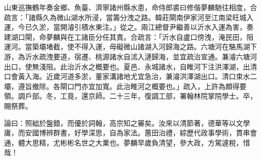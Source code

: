 \begin{pinyinscope}
山東巡撫鶴年奏金鄉、魚臺、濟寧諸州縣水患，命侍郎裘曰修偕夢麟馳往相度，合疏言：「諸縣久為微山湖水所浸，當籌分洩之路。韓莊閘南伊家河至江南梁旺城入運，今已久淤，當開濬引積水東注。」從之。兩江總督尹繼善以沂水入運為害，奏建湖口閘，命夢麟與在工諸臣分任其責。合疏言：「沂水自盧口傍洩，淹民田，阻運河。當築壩堵截，使不得入運，毋礙微山諸湖入河歸海之路。六塘河在駱馬湖下游，為沂水疏洩要道，宿遷、桃源諸水自沭入漣歸海，並宜疏治宣通。兼濬六塘河出口，使無淺阻。此治沂水之概要也。夏邑、永城諸水，自睢河下注洪澤湖，出清口會黃入海。近歲河道多淤，董家溝諸地尤宜急治，兼濬洪澤湖出口。清口束水二壩，遵旨撤除。各閘口門亦宜加寬。此治睢河之概要也。」疏入，上許為頗得要領。調戶部。冬，工竟，還京師。二十三年，復調工部，署翰林院掌院學士。卒，賜祭葬。

論曰：照絀於盤錯，而優於詞翰，高宗知之審矣。汝來以清節著，德華等以文學庸，而安國博辨群書，好學深思，自為家法。蕙田治禮，綜歷代政事學術，貫串會通，體大思精，尤彬彬名世之大業也。夢麟早歲負清望，參大政，方駕遽稅，惜哉！


\end{pinyinscope}